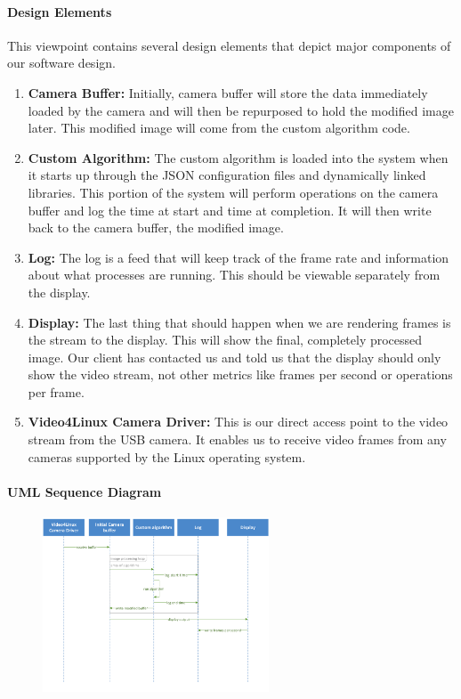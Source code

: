 	\paragraph{Design Elements}
	This viewpoint contains several design elements that depict major components of our software design.\\
	
	\begin{enumerate}[leftmargin=2cm,labelindent=2cm]
	\item \textbf{Camera Buffer:}
	Initially, camera buffer will store the data immediately loaded by the camera and will then be repurposed to hold the modified image later. This 		modified image will come from the custom algorithm code.

	\item \textbf{Custom Algorithm:}
	The custom algorithm is loaded into the system when it starts up through the JSON configuration files and dynamically linked libraries. This 		portion of the system will perform operations on the camera buffer and log the time at start and time at completion. It will then write back to the 		camera buffer, the modified image.

	\item \textbf{Log:}
	The log is a feed that will keep track of the frame rate and information about what processes are running. This should be viewable separately from 	the display.

	\item \textbf{Display:}
	The last thing that should happen when we are rendering frames is the stream to the display. This will show the final, completely processed 		image. Our client has contacted us and told us that the display should only show the video stream, not other metrics like frames per second or 		operations per frame.

	\item \textbf{Video4Linux Camera Driver:}
	This is our direct access point to the video stream from the USB camera. It enables us to receive video frames from any cameras supported by 	the Linux operating system.\\
	\end{enumerate}
	
	\paragraph{UML Sequence Diagram}
	\begin{figure}[!ht] 
		\centering
		\includegraphics[width=0.6\textwidth,natwidth=610,natheight=642]{images/UML_Diagram.png}  
		\end{figure}
	
